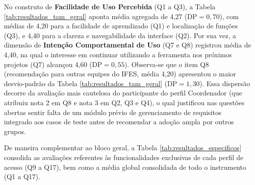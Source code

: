 No construto de \textbf{Facilidade de Uso Percebida} (Q1 a Q3), a Tabela \ref{tab:resultados_tam_geral} aponta média agregada de 4,27 ($\text{DP} = 0,70$), com médias de 4,20 para a facilidade de aprendizado (Q1) e localização de funções (Q3), e 4,40 para a clareza e navegabilidade da interface (Q2). Por sua vez, a dimensão de \textbf{Intenção Comportamental de Uso} (Q7 e Q8) registrou média de 4,40, na qual o interesse em continuar utilizando a ferramenta nos próximos projetos (Q7) alcançou 4,60 ($\text{DP} = 0,55$). Observa-se que o item Q8 (recomendação para outras equipes do IFES, média 4,20) apresentou o maior desvio-padrão da Tabela \ref{tab:resultados_tam_geral} ($\text{DP} = 1,30$). Essa dispersão decorre da avaliação mais cautelosa do participante do perfil Coordenador (que atribuiu nota 2 em Q8 e nota 3 em Q2, Q3 e Q4), o qual justificou nas questões abertas sentir falta de um módulo prévio de gerenciamento de requisitos integrado aos casos de teste antes de recomendar a adoção ampla por outros grupos.

De maneira complementar ao bloco geral, a Tabela \ref{tab:resultados_especificos} consolida as avaliações referentes às funcionalidades exclusivas de cada perfil de acesso (Q9 a Q17), bem como a média global consolidada de todo o instrumento (Q1 a Q17).

